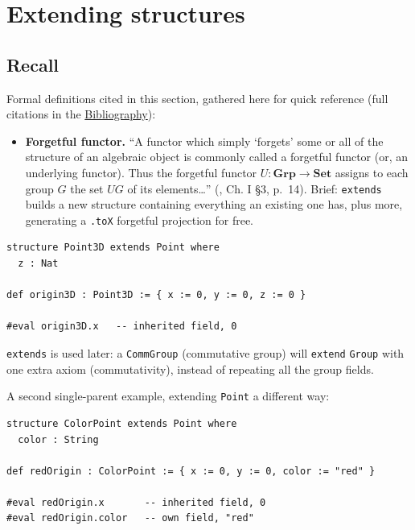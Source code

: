 \section{Extending structures}\label{sec:02-functions-and-structures:03-extending-structures:1}

\subsection{Recall}\label{sec:02-functions-and-structures:03-extending-structures:2}

Formal definitions cited in this section, gathered here for quick reference (full citations in the \hyperref[sec:root:bibliography:1]{Bibliography}):

\begin{itemize}
\tightlist
\item
  \textbf{Forgetful functor.} ``A functor which simply `forgets' some or all of the structure of an algebraic object is commonly called a forgetful functor (or, an underlying functor). Thus the forgetful functor \(U : \mathbf{Grp} \to \mathbf{Set}\) assigns to each group \(G\) the set \(UG\) of its elements\ldots{}'' (\cite{MacLane1998}, Ch. I §3, p.~14). Brief: \texttt{extends} builds a new structure containing everything an existing one has, plus more, generating a \texttt{.toX} forgetful projection for free.
\end{itemize}

\begin{lstlisting}
structure Point3D extends Point where
  z : Nat

def origin3D : Point3D := { x := 0, y := 0, z := 0 }

#eval origin3D.x   -- inherited field, 0
\end{lstlisting}

\texttt{extends} is used later: a \texttt{CommGroup} (commutative group) will \texttt{extend} \texttt{Group} with one extra axiom (commutativity), instead of repeating all the group fields.

A second single-parent example, extending \texttt{Point} a different way:

\begin{lstlisting}
structure ColorPoint extends Point where
  color : String

def redOrigin : ColorPoint := { x := 0, y := 0, color := "red" }

#eval redOrigin.x       -- inherited field, 0
#eval redOrigin.color   -- own field, "red"
\end{lstlisting}


